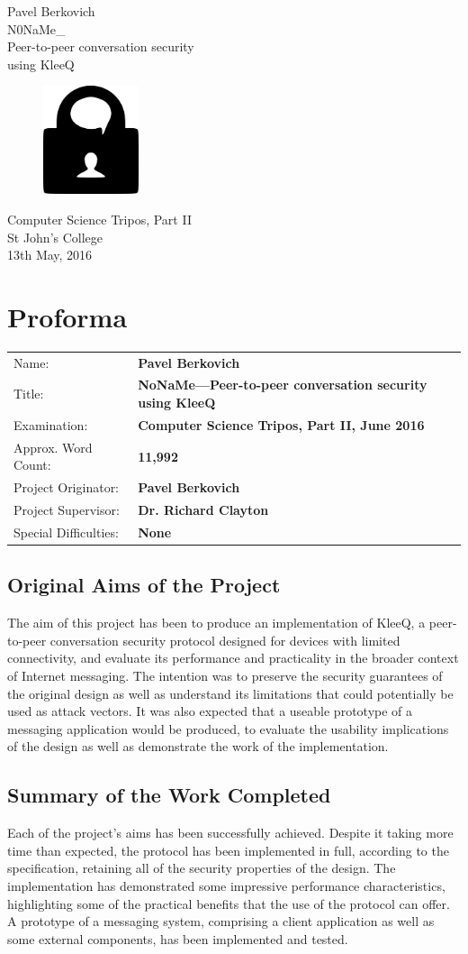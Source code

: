 \documentclass[a4paper, twoside, 12pt]{report}
\newcommand{\funkytt}{\fontfamily{AnonymousPro}\selectfont}
\newcommand{\skippage}{\cleardoublepage}
\newcommand*{\titleTH}{ %
\begingroup
\raggedleft
\thispagestyle{empty}
\newgeometry{margin=2.5cm}
{\Large Pavel Berkovich}\\[0.167\textheight] \centering
{\huge{\funkytt N0NaMe\_}}\\[\baselineskip]
{\Large Peer-to-peer conversation security \\ using KleeQ} \\
\vspace{2.5cm}
\begin{figure}[h]
    \centering
    \includegraphics[width = 0.25\textwidth]{lock_chat.png.png} 
\end{figure}
\vspace{3cm}
{\large Computer Science Tripos, Part II}\\ \vspace{3mm}
{\large St John's College} \\ \vspace{3mm}
{\large 13th May, 2016}
\vfill
\clearpage
\endgroup}
\begin{document}
\titleTH

\raggedbottom

\skippage


\chapter*{Proforma}
\begin{tabular}{l >{\bfseries}l}
    Name: & Pavel Berkovich \\
    Title: & NoNaMe---Peer-to-peer conversation security using KleeQ \\
    Examination: & Computer Science Tripos, Part II, June 2016 \\
    Approx. Word Count: & 11,992 \\
    Project Originator: & Pavel Berkovich \\
    Project Supervisor: & Dr. Richard Clayton \\
    Special Difficulties: & None
\end{tabular}

\section*{Original Aims of the Project}
The aim of this project has been to produce an implementation of KleeQ, a peer-to-peer conversation security protocol designed for devices with limited connectivity, and evaluate its performance and practicality in the broader context of Internet messaging. The intention was to preserve the security guarantees of the original design as well as understand its limitations that could potentially be used as attack vectors. It was also expected that a useable prototype of a messaging application would be produced, to evaluate the usability implications of the design as well as demonstrate the work of the implementation.

\section*{Summary of the Work Completed}

Each of the project's aims has been successfully achieved. Despite it taking more time than expected, the protocol has been implemented in full, according to the specification, retaining all of the security properties of the design. The implementation has demonstrated some impressive performance characteristics, highlighting some of the practical benefits that the use of the protocol can offer. A prototype of a messaging system, comprising a client application as well as some external components, has been implemented and tested.
\end{document}
